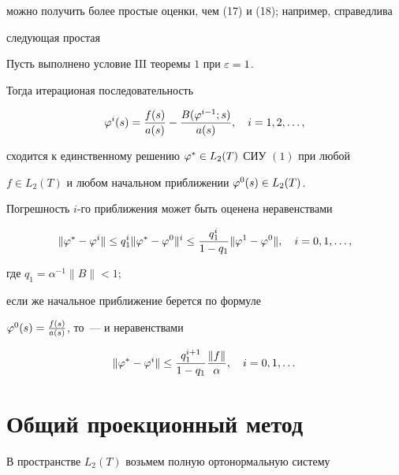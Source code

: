 можно получить более простые оценки, чем (17) и (18); например, справедлива 


следующая простая








\begin{thm}


Пусть выполнено условие $\mathrm{III}$ теоремы $1$ при $\varepsilon = 1$. 


Тогда итерационая последовательность


$$


\vp^i(s) = \frac{f(s)}{a(s)}-\frac{B(\vp^{i-1};s)}{a(s)},\quad i=1,2,\dotsc,


$$


сходится к единственному решению $\varphi^*\in L_2(T)$ СИУ $(1)$ при любой


$f\in L_2(T)$ и любом начальном приближении $\varphi^0(s)\in L_2(T)$. 


Погрешность $i$-го приближения может быть оценена неравенствами


$$


\|\vp^*-\vp^i\| \lea q_1^i\|\vp^*-\vp^0\|^i \lea


\frac{q_1^i}{1-q_1}\|\vp^1-\vp^0\|,\quad


i=0,1,\dotsc,


$$


где $q_1=\alpha^{-1}\|B\|<1;$


если же начальное приближение берется по формуле


$\varphi^0(s) = \frac{f(s)}{a(s)}$, то~--- и неравенствами


$$


\|\vp^* - \vp^i\|\lea \frac{q_1^{i+1}}{1-q_1}\frac{\|f\|}{\alpha},


\quad i=0,1,\dotsc


$$


\end{thm}








\section{Общий проекционный метод}





В пространстве $L_2(T)$ возьмем полную ортонормальную систему


